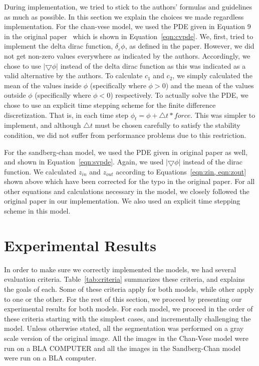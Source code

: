 \documentclass[10pt,journal,letterpaper,compsoc]{IEEEtran}
\begin{document}
During implementation, we tried to stick to the authors' formulas and guidelines as much as possible. In this section we explain the choices we made regardless
implementation. For the chan-vese model, we used the PDE given in Equation 9 in the original paper~\cite{chan2001active} which is shown in
Equation~\ref{eqn:cvpde}.  We, first, tried to implement the delta dirac function, $\delta_{\varepsilon}\phi$, as defined in the paper. However, we did not
get non-zero values everywhere as indicated by the authors. Accordingly, we chose to use $|\bigtriangledown\phi|$ instead of the delta dirac function as this
was indicated as a valid alternative by the authors. To calculate $c_{1}$ and $c_{2}$, we simply calculated the mean of the values inside $\phi$ (specifically
where $\phi > 0$) and the mean of the values outside $\phi$ (specifically where $\phi < 0$) respectively. To actually solve the PDE, we chose to use an explicit
time stepping scheme for the finite difference discretization. That is, in each time step $\phi_{t} = \phi + \triangle t*force$. This was simpler to implement,
and although $\triangle t$ must be chosen carefully to satisfy the stability condition, we did not suffer from performance problems due to this restriction.

For the sandberg-chan model, we used the PDE given in original paper as well, and shown in Equation~\ref{eqn:svpde}. Again, we used $|\bigtriangledown\phi|$
instead of the dirac function. We calculated $z_{in}$ and $z_{out}$ according to Equations~\ref{eqn:zin, eqn:zout} shown above which have been corrected for
the typo in the original paper. For all other equations and calculations necessary in the model, we closely followed the original paper in our implementation.
We also used an explicit time stepping scheme in this model. 


\section{Experimental Results}
\label{sec:results}

In order to make sure we correctly implemented the models, we had several evaluation criteria. Table~\ref{tab:criteria} summarizes these criteria, and explains
the goals of each. Some of these criteria apply for both models, while other apply to one or the other. For the rest of this section, we proceed by presenting
our experimental results for both models. For each model, we proceed in the order of these criteria starting with the simplest
cases, and incrementally challenging the model. Unless otherwise stated, all the segmentation was performed on a gray scale version of the original image. All
the images in the Chan-Vese model were run on a BLA COMPUTER and all the images in the Sandberg-Chan model were run on a BLA computer.
\end{document}
